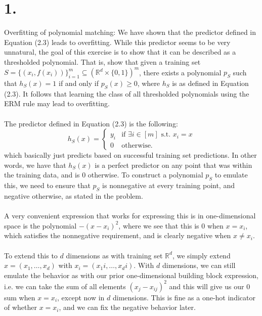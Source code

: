 \documentclass{article}
\begin{document}
\thispagestyle{firstpageheader}
{\Large 

\section*{1.}
Overfitting of polynomial matching: We have shown that the predictor defined in Equation (2.3) leads to overfitting. While this predictor seems to be very unnatural, the goal of this exercise is to show that it can be described as a thresholded polynomial. That is, show that given a training set \(S = \{(x_i, f(x_i))\}_{i=1}^m \subseteq (\mathbb{R}^d \times \{0,1\})^m\), there exists a polynomial \(p_S\) such that \(h_S(x) = 1\) if and only if \(p_S(x) \geq 0\), where \(h_S\) is as defined in Equation (2.3). It follows that learning the class of all thresholded polynomials using the ERM rule may lead to overfitting.
\\ \\
The predictor defined in Equation (2.3) is the following:
\[
  h_S(x) = 
  \begin{cases} 
    y_i & \text{if } \exists i \in [m] \text{ s.t. } x_i = x \\ 
    0 & \text{otherwise.} 
  \end{cases}
\]
which basically just predicts based on successful training set predictions. In other words, we have that \(h_S(x)\) is a perfect predictor on any point that was within the training data, and is 0 otherwise. To construct a polynomial \(p_S\) to emulate this, we need to ensure that \(p_S\) is nonnegative at every training point, and negative otherwise, as stated in the problem. \\ \\
A very convenient expression that works for expressing this is in one-dimensional space is the polynomial \(-(x-x_i)^2\), where we see that this is 0 when \(x = x_i\), which satisfies the nonnegative requirement, and is clearly negative when \(x \neq x_i\). \\ \\
To extend this to \(d\) dimensions as with training set \(\mathbb{R}^d\), we simply extend \(x = (x_1, \dots, x_d)\) with \(x_i = (x_1i, \dots, x_di)\). With \(d\) dimensions, we can still emulate the behavior as with our prior one-dimensional building block expression, i.e. we can take the sum of all elements \((x_j - x_{ij})^2\) and this will give us our 0 sum when \(x = x_i\), except now in \(d\) dimensions. This is fine as a one-hot indicator of whether \(x = x_i\), and we can fix the negative behavior later. \\ \\
}
\end{document}
